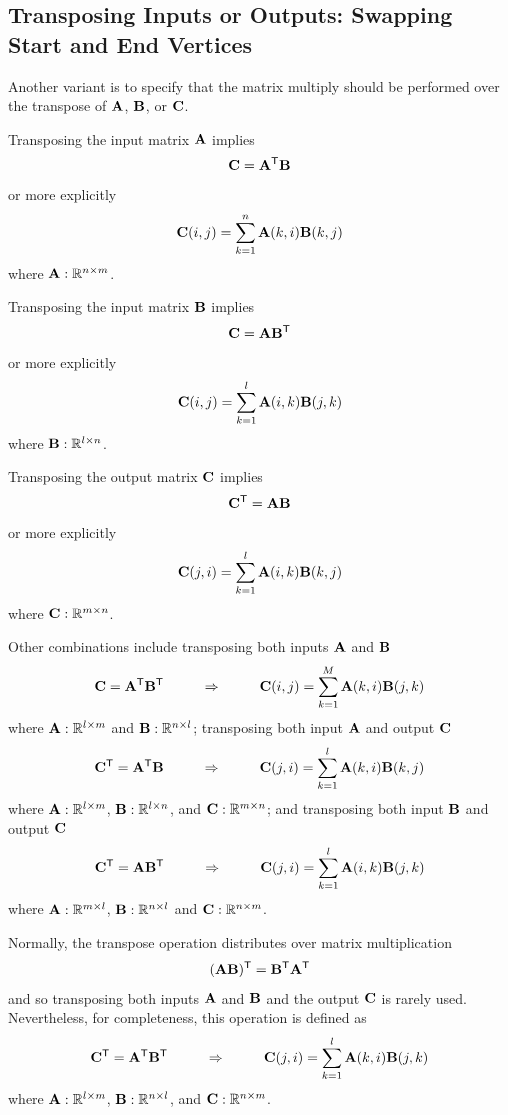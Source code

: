 \subsection{Transposing Inputs or Outputs: Swapping Start and End Vertices}

Another variant is to specify that the matrix multiply should be performed over the transpose of  ${\bf A}$, ${\bf B}$, or ${\bf C}$.

Transposing the input matrix ${\bf A}$ implies
$$
   {\bf C} = {\bf A}^{\sf T} {\bf B}
$$
or more explicitly
$$
   {\bf C}(i,j) = \sum_{k=1}^n {\bf A}(k,i) {\bf B}(k,j)
$$
where ${\bf A}: \mathbb{R}^{n \times m}$.

Transposing the input matrix ${\bf B}$ implies
$$
   {\bf C} = {\bf A} {\bf B}^{\sf T}
$$
or more explicitly
$$
   {\bf C}(i,j) = \sum_{k=1}^l {\bf A}(i,k) {\bf B}(j,k)
$$
where ${\bf B}: \mathbb{R}^{l \times n}$.


Transposing the output matrix ${\bf C}$ implies
$$
   {\bf C}^{\sf T} = {\bf A} {\bf B}
$$
or more explicitly
$$
   {\bf C}(j,i) = \sum_{k=1}^l {\bf A}(i,k) {\bf B}(k,j)
$$
where ${\bf C}: \mathbb{R}^{m \times n}$.

Other combinations include transposing both inputs ${\bf A}$ and ${\bf B}$
$$
   {\bf C} = {\bf A}^{\sf T} {\bf B}^{\sf T} ~~~~~~~~ \Rightarrow ~~~~~~~~ {\bf C}(i,j) = \sum_{k=1}^M {\bf A}(k,i) {\bf B}(j,k)
$$
where ${\bf A}: \mathbb{R}^{l \times m}$ and ${\bf B}: \mathbb{R}^{n \times l}$; transposing both input ${\bf A}$ and output ${\bf C}$
$$
   {\bf C}^{\sf T} = {\bf A}^{\sf T} {\bf B} ~~~~~~~~ \Rightarrow ~~~~~~~~ {\bf C}(j,i) = \sum_{k=1}^l {\bf A}(k,i) {\bf B}(k,j)
$$
where ${\bf A}: \mathbb{R}^{l \times m}$, ${\bf B}: \mathbb{R}^{l \times n}$, and ${\bf C}: \mathbb{R}^{m \times n}$; and transposing both input ${\bf B}$ and output ${\bf C}$
$$
   {\bf C}^{\sf T} = {\bf A} {\bf B}^{\sf T} ~~~~~~~~ \Rightarrow ~~~~~~~~ {\bf C}(j,i) = \sum_{k=1}^l {\bf A}(i,k) {\bf B}(j,k)
$$
where ${\bf A}: \mathbb{R}^{m \times l}$, ${\bf B}: \mathbb{R}^{n \times l}$ and ${\bf C}: \mathbb{R}^{n \times m}$.

Normally, the transpose operation distributes over matrix multiplication
$$
({\bf A} {\bf B})^{\sf T} ={\bf B}^{\sf T} {\bf A}^{\sf T}
$$
and so transposing both inputs ${\bf A}$ and ${\bf B}$ and the output ${\bf C}$ is rarely used.  Nevertheless, for completeness, this operation is defined as
$$
   {\bf C}^{\sf T} = {\bf A}^{\sf T} {\bf B}^{\sf T} ~~~~~~~~ \Rightarrow ~~~~~~~~ {\bf C}(j,i) = \sum_{k=1}^l {\bf A}(k,i) {\bf B}(j,k)
$$
where ${\bf A}: \mathbb{R}^{l \times m}$, ${\bf B}: \mathbb{R}^{n \times l}$, and ${\bf C}: \mathbb{R}^{n \times m}$.

